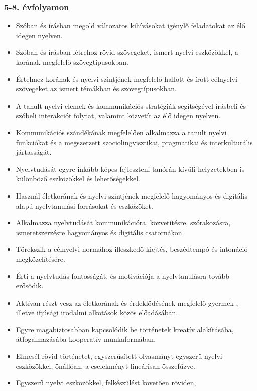 \hypertarget{evfolyamon-9}{%
\subsubsection{5-8. évfolyamon}\label{evfolyamon-9}}

\begin{itemize}
\item
  Szóban és írásban megold változatos kihívásokat igénylő feladatokat az
  élő idegen nyelven.
\item
  Szóban és írásban létrehoz rövid szövegeket, ismert nyelvi
  eszközökkel, a korának megfelelő szövegtípusokban.
\item
  Értelmez korának és nyelvi szintjének megfelelő hallott és írott
  célnyelvi szövegeket az ismert témákban és szövegtípusokban.
\item
  A tanult nyelvi elemek és kommunikációs stratégiák segítségével
  írásbeli és szóbeli interakciót folytat, valamint közvetít az élő
  idegen nyelven.
\item
  Kommunikációs szándékának megfelelően alkalmazza a tanult nyelvi
  funkciókat és a megszerzett szociolingvisztikai, pragmatikai és
  interkulturális jártasságát.
\item
  Nyelvtudását egyre inkább képes fejleszteni tanórán kívüli
  helyzetekben is különböző eszközökkel és lehetőségekkel.
\item
  Használ életkorának és nyelvi szintjének megfelelő hagyományos és
  digitális alapú nyelvtanulási forrásokat és eszközöket.
\item
  Alkalmazza nyelvtudását kommunikációra, közvetítésre, szórakozásra,
  ismeretszerzésre hagyományos és digitális csatornákon.
\item
  Törekszik a célnyelvi normához illeszkedő kiejtés, beszédtempó és
  intonáció megközelítésére.
\item
  Érti a nyelvtudás fontosságát, és motivációja a nyelvtanulásra tovább
  erősödik.
\item
  Aktívan részt vesz az életkorának és érdeklődésének megfelelő
  gyermek-, illetve ifjúsági irodalmi alkotások közös előadásában.
\item
  Egyre magabiztosabban kapcsolódik be történetek kreatív alakításába,
  átfogalmazásába kooperatív munkaformában.
\item
  Elmesél rövid történetet, egyszerűsített olvasmányt egyszerű nyelvi
  eszközökkel, önállóan, a cselekményt lineárisan összefűzve.
\item
  Egyszerű nyelvi eszközökkel, felkészülést követően röviden,

\end{itemize}
